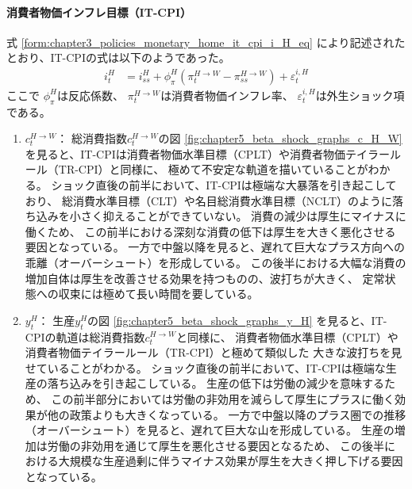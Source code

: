 \paragraph{消費者物価インフレ目標（IT-CPI）}
\label{sec:chapter5_beta_shock_policies_it_cpi}
式
\eqref{form:chapter3_policies_monetary_home_it_cpi_i_H_eq}
により記述されたとおり、IT-CPIの式は以下のようであった。
\begin{align}
\label{form:chapter5_beta_shock_policies_it_cpi_i_H_eq}
    i_t^H&=i_{ss}^H+\phi_{\pi}^H(\pi_t^{H\to W}-\pi_{ss}^{H\to W})+\varepsilon_t^{i,H}
\end{align}
ここで
\(\phi_{\pi}^H\)は反応係数、
\(\pi_t^{H\to W}\)は消費者物価インフレ率、
\(\varepsilon_t^{i,H}\)は外生ショック項である。
\begin{enumerate}
    \item
    \label{itm:chapter5_beta_shock_policies_it_cpi_c_H_W}
        \(c_t^{H\to W}\)：
        総消費指数\(c_t^{H\to W}\)の図
        \ref{fig:chapter5_beta_shock_graphs_c_H_W}
        を見ると、IT-CPIは消費者物価水準目標（CPLT）や消費者物価テイラールール（TR-CPI）と同様に、
        極めて不安定な軌道を描いていることがわかる。
        ショック直後の前半において、IT-CPIは極端な大暴落を引き起こしており、
        総消費水準目標（CLT）や名目総消費水準目標（NCLT）のように落ち込みを小さく抑えることができていない。
        消費の減少は厚生にマイナスに働くため、
        この前半における深刻な消費の低下は厚生を大きく悪化させる要因となっている。
        一方で中盤以降を見ると、遅れて巨大なプラス方向への乖離（オーバーシュート）を形成している。
        この後半における大幅な消費の増加自体は厚生を改善させる効果を持つものの、波打ちが大きく、
        定常状態への収束には極めて長い時間を要している。
    \item
    \label{itm:chapter5_beta_shock_policies_it_cpi_y_H}
        \(y_t^H\)：
        生産\(y_t^H\)の図
        \ref{fig:chapter5_beta_shock_graphs_y_H}
        を見ると、IT-CPIの軌道は総消費指数\(c_t^{H\to W}\)と同様に、
        消費者物価水準目標（CPLT）や消費者物価テイラールール（TR-CPI）と極めて類似した
        大きな波打ちを見せていることがわかる。
        ショック直後の前半において、IT-CPIは極端な生産の落ち込みを引き起こしている。
        生産の低下は労働の減少を意味するため、
        この前半部分においては労働の非効用を減らして厚生にプラスに働く効果が他の政策よりも大きくなっている。
        一方で中盤以降のプラス圏での推移（オーバーシュート）を見ると、遅れて巨大な山を形成している。
        生産の増加は労働の非効用を通じて厚生を悪化させる要因となるため、
        この後半における大規模な生産過剰に伴うマイナス効果が厚生を大きく押し下げる要因となっている。

\end{enumerate}
